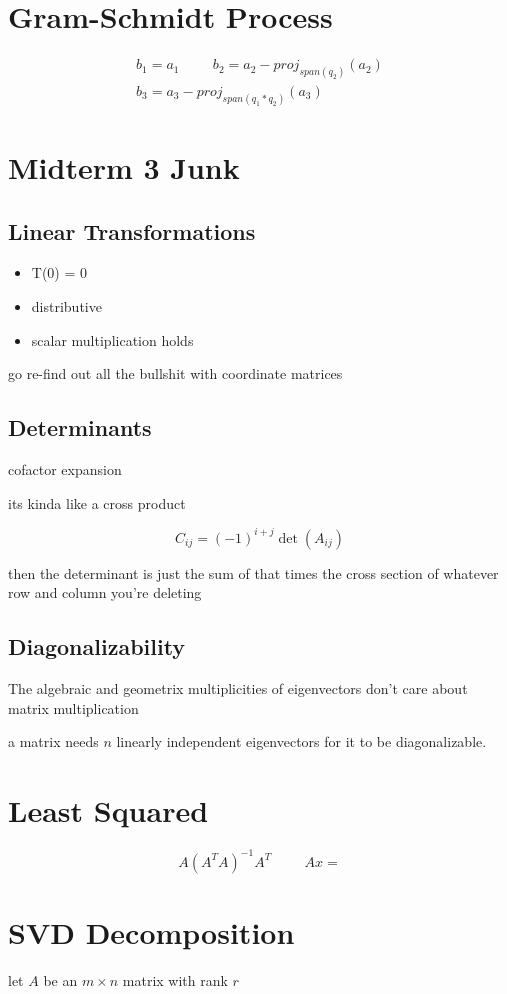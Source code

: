 \documentclass[fleqn]{report}
\newcommand{\hp}{\hspace{1cm}}
\newcommand{\equations} [1] {
\begin{gather*}
#1
\end{gather*}
}
\begin{document}
\section{Gram-Schmidt Process}
\equations{
    b_1 = a_1
    \hp 
    b_2 = a_2 - proj_{span(q_2)}(a_2)
    \\
    b_3 =  a_3 - proj_{span(q_1 * q_2)}(a_3)
}

\section{Midterm 3 Junk}
\subsection{Linear Transformations}
\begin{itemize}
\item
T(0) = 0
\item
distributive 
\item 
scalar multiplication holds
\end{itemize}

go re-find out all the bullshit with coordinate matrices 

\subsection{Determinants}
cofactor expansion 

its kinda like a cross product 

\[
C_{ij} = (-1)^{i + j} \det(A_{ij})
\]

then the determinant is just the sum of that times the cross section of 
whatever row and column you're deleting 

\subsection{Diagonalizability}
The algebraic and geometrix multiplicities of eigenvectors don't 
care about matrix multiplication 

a matrix needs $n$ linearly independent eigenvectors for it to be diagonalizable. 

\section{Least Squared}
\[
A (A^T A)^{-1} A^T
\hp 
A x = 
\]


\section{SVD Decomposition}
let $A$ be an $m \times n$ matrix with rank $r$
\end{document}
